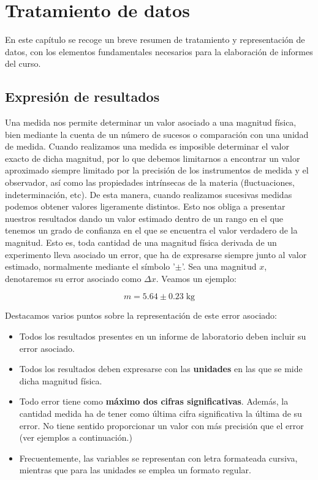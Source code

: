 \documentclass{book}
\begin{document}
\setcounter{chapter}{1}

\chapter*{Tratamiento de datos}

En este capítulo se recoge un breve resumen de tratamiento y representación de datos,
con los elementos fundamentales necesarios para la elaboración de informes del curso.

\section{Expresión de resultados}

Una medida nos permite determinar un valor asociado a una magnitud física, bien mediante
la cuenta de un número de sucesos o comparación con una unidad de medida. Cuando realizamos
una medida es imposible determinar el valor exacto de dicha magnitud, por lo que debemos
limitarnos a encontrar un valor aproximado siempre limitado por la precisión de los instrumentos
de medida y el observador, así como las propiedades intrínsecas de la materia (fluctuaciones,
indeterminación, etc). De esta manera, cuando realizamos sucesivas medidas podemos obtener valores
ligeramente distintos. Esto nos obliga a presentar nuestros resultados dando un valor estimado dentro
de un rango en el que tenemos un grado de confianza en el que se encuentra el valor verdadero de
la magnitud. Esto es, toda cantidad de una magnitud física derivada de un experimento lleva asociado un error, 
que ha de expresarse siempre junto al valor estimado, normalmente mediante el símbolo '$\pm$'.
Sea una magnitud $x$, denotaremos su error asociado como $\Delta x$. Veamos un ejemplo:


\begin{equation}
    m = 5.64 \pm 0.23 \; \mathrm{kg}
\end{equation}

Destacamos varios puntos sobre la representación de este error asociado:

\begin{itemize}
  \item Todos los resultados presentes en un informe de laboratorio deben incluir su error 
  asociado.
  \item Todos los resultados deben expresarse con las \textbf{unidades} en las que se mide dicha 
  magnitud física.
  \item Todo error tiene como \textbf{máximo dos cifras significativas}. Además, la cantidad medida
  ha de tener como última cifra significativa la última de su error. No tiene sentido proporcionar
  un valor con más precisión que el error (ver ejemplos a continuación.)
  \item Frecuentemente, las variables se representan con letra formateada cursiva, mientras 
  que para las unidades se emplea un formato regular.
\end{itemize}
\end{document}
